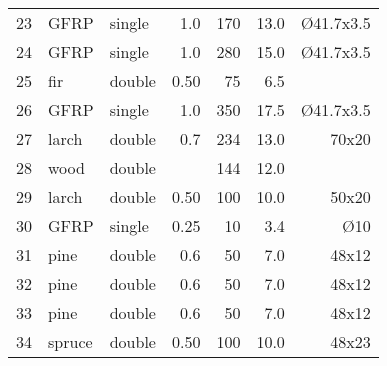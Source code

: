 {{{\begin{tabularx}{\textwidth}{@{}lXl rrrr@{}}
					23 & GFRP & single & 1.0 & 170 & 13.0 & \O 41.7x3.5\\
					24 & GFRP & single & 1.0 & 280 & 15.0 & \O 41.7x3.5\\
					25 & fir & double & 0.50 & 75 & 6.5 & \\
					26 & GFRP & single & 1.0 & 350 & 17.5 & \O 41.7x3.5\\
					27 & larch & double & 0.7 & 234 & 13.0 & 70x20\\
					28 & wood & double &  & 144 & 12.0 & \\
					29 & larch & double & 0.50 & 100 & 10.0 & 50x20\\
					30 & GFRP & single & 0.25 & 10 & 3.4 & \O 10\\
					31 & pine & double & 0.6 & 50 & 7.0 & 48x12\\
					32 & pine & double & 0.6 & 50 & 7.0 & 48x12\\
					33 & pine & double & 0.6 & 50 & 7.0 & 48x12\\
					34 & spruce & double & 0.50 & 100 & 10.0 & 48x23\\
					\bottomrule
				\end{tabularx}}
	}
}

